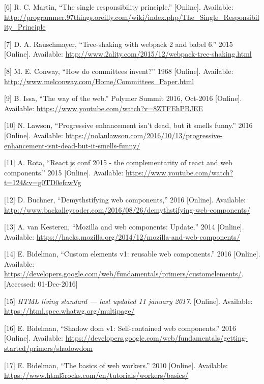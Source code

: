 \documentclass[]{article}
\begin{document}
\hypertarget{ref-Martin}{}
{[}6{]} R. C. Martin, ``The single responsibility principle.''
{[}Online{]}. Available:
\url{http://programmer.97things.oreilly.com/wiki/index.php/The_Single_Responsibility_Principle}

\hypertarget{ref-Rauschmayer2015}{}
{[}7{]} D. A. Rauschmayer, ``Tree-shaking with webpack 2 and babel 6.''
2015 {[}Online{]}. Available:
\url{http://www.2ality.com/2015/12/webpack-tree-shaking.html}

\hypertarget{ref-Conway1968}{}
{[}8{]} M. E. Conway, ``How do committees invent?'' 1968 {[}Online{]}.
Available: \url{http://www.melconway.com/Home/Committees_Paper.html}

\hypertarget{ref-Issa2016}{}
{[}9{]} B. Issa, ``The way of the web.'' Polymer Summit 2016, Oct-2016
{[}Online{]}. Available:
\url{https://www.youtube.com/watch?v=8ZTFEhPBJEE}

\hypertarget{ref-Lawson2016}{}
{[}10{]} N. Lawson, ``Progressive enhancement isn't dead, but it smells
funny.'' 2016 {[}Online{]}. Available:
\url{https://nolanlawson.com/2016/10/13/progressive-enhancement-isnt-dead-but-it-smells-funny/}

\hypertarget{ref-Rota2015}{}
{[}11{]} A. Rota, ``React.js conf 2015 - the complementarity of react
and web components.'' 2015 {[}Online{]}. Available:
\url{https://www.youtube.com/watch?t=124\&v=g0TD0efcwVg}

\hypertarget{ref-Buchner2016}{}
{[}12{]} D. Buchner, ``Demythstifying web components,'' 2016
{[}Online{]}. Available:
\url{http://www.backalleycoder.com/2016/08/26/demythstifying-web-components/}

\hypertarget{ref-vanKesteren2014}{}
{[}13{]} A. van Kesteren, ``Mozilla and web components: Update,'' 2014
{[}Online{]}. Available:
\url{https://hacks.mozilla.org/2014/12/mozilla-and-web-components/}

\hypertarget{ref-Bidelman2016}{}
{[}14{]} E. Bidelman, ``Custom elements v1: reusable web components.''
2016 {[}Online{]}. Available:
\url{https://developers.google.com/web/fundamentals/primers/customelements/}.
{[}Accessed: 01-Dec-2016{]}

\hypertarget{ref-HTML}{}
{[}15{]} \emph{HTML living standard --- last updated 11 january 2017}.
{[}Online{]}. Available: \url{https://html.spec.whatwg.org/multipage/}

\hypertarget{ref-Bidelman2016shadow}{}
{[}16{]} E. Bidelman, ``Shadow dom v1: Self-contained web components.''
2016 {[}Online{]}. Available:
\url{https://developers.google.com/web/fundamentals/getting-started/primers/shadowdom}

\hypertarget{ref-Bidelman2010}{}
{[}17{]} E. Bidelman, ``The basics of web workers.'' 2010 {[}Online{]}.
Available: \url{https://www.html5rocks.com/en/tutorials/workers/basics/}
\end{document}
